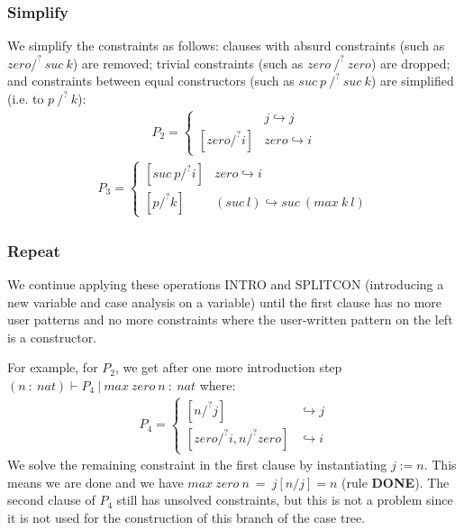 \documentclass[10pt, xelatex, hyperref={pdfpagelabels=false,breaklinks}]{beamer}
\begin{document}
\begin{frame}[fragile]
  \frametitle{Simplify}
  We simplify the constraints as follows: clauses with absurd constraints (such as $zero /^?\ suc\ k$) are removed; trivial constraints (such as $zero\ /^?\ zero$) are dropped; and constraints between equal constructors (such as $suc\ p\ /^?\ suc\ k$) are simplified (i.e. to $p\ /^?\ k$):
  \begin{align*}
    P_2 =
      \begin{cases}
         & j \hookrightarrow j \\
        [zero /^? i] & zero \hookrightarrow i
      \end{cases}       
  \end{align*}
  \begin{align*}
    P_3 =
      \begin{cases}
        [suc\ p /^? i] & zero \hookrightarrow i \\
        [p /^? k] & (suc\ l) \hookrightarrow suc\ (max\ k\ l) 
      \end{cases}       
  \end{align*}
\end{frame}

\begin{frame}[fragile]
  \frametitle{Repeat}
  We continue applying these operations INTRO and SPLITCON (introducing a new variable and case analysis on a variable) until the first clause has no more user patterns and no more constraints where the user-written pattern on the left is a constructor.

  For example, for $P_2$, we get after one more introduction step $(n\ :\ nat) ⊢ P_4\ |\ max\ zero\ n\ :\ nat$ where:
  \begin{align*}
    P_4 =
      \begin{cases}
        [n /^? j] &  \hookrightarrow j \\
        [zero /^? i, n /^? zero] & \hookrightarrow i 
      \end{cases}       
  \end{align*}
  We solve the remaining constraint in the first clause by instantiating $j := n$. This means we are done and we have $max\ zero\ n\ =\ j[n / j] = n$ (rule \textbf{DONE}). The second clause of $P_4$ still has unsolved constraints, but this is not a problem since it is not used for the construction of this branch of the case tree.
\end{frame}
\end{document}
